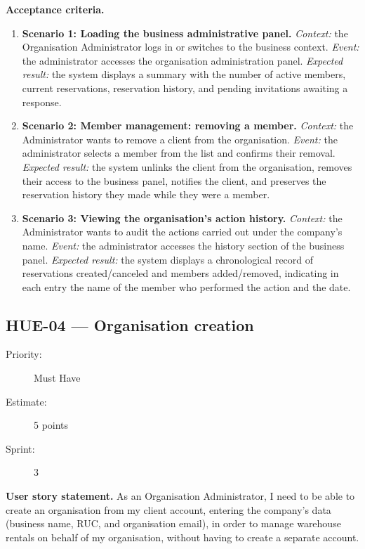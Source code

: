 \documentclass[11pt,a4paper,oneside]{report}
\begin{document}
\textbf{Acceptance criteria.}
\begin{enumerate}
\item \textbf{Scenario 1: Loading the business administrative panel.} \emph{Context:} the Organisation Administrator logs in or switches to the business context. \emph{Event:} the administrator accesses the organisation administration panel. \emph{Expected result:} the system displays a summary with the number of active members, current reservations, reservation history, and pending invitations awaiting a response.
\item \textbf{Scenario 2: Member management: removing a member.} \emph{Context:} the Administrator wants to remove a client from the organisation. \emph{Event:} the administrator selects a member from the list and confirms their removal. \emph{Expected result:} the system unlinks the client from the organisation, removes their access to the business panel, notifies the client, and preserves the reservation history they made while they were a member.
\item \textbf{Scenario 3: Viewing the organisation's action history.} \emph{Context:} the Administrator wants to audit the actions carried out under the company's name. \emph{Event:} the administrator accesses the history section of the business panel. \emph{Expected result:} the system displays a chronological record of reservations created/canceled and members added/removed, indicating in each entry the name of the member who performed the action and the date.
\end{enumerate}

\subsection{HUE-04 --- Organisation creation}
\label{req:HUE-04}
\begin{description}
\item[Priority:] Must Have \quad \item[Estimate:] 5 points \quad \item[Sprint:] 3
\end{description}

\textbf{User story statement.} As an Organisation Administrator, I need to be able to create an organisation from my client account, entering the company's data (business name, RUC, and organisation email), in order to manage warehouse rentals on behalf of my organisation, without having to create a separate account.
\end{document}
